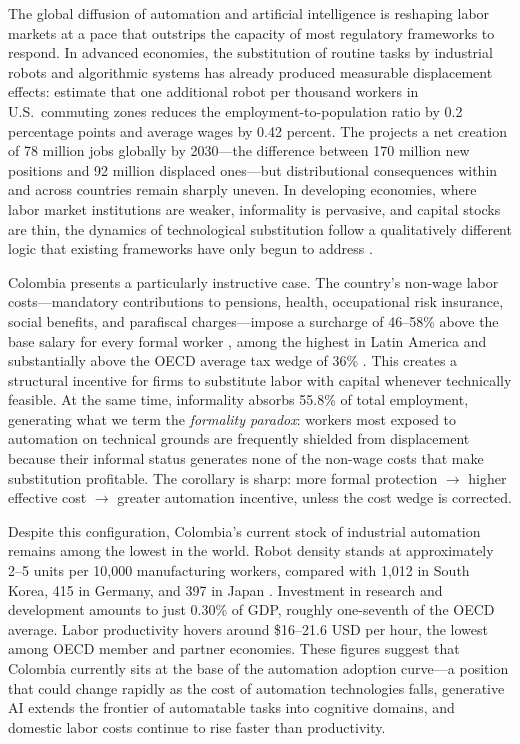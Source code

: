 \documentclass{article}
\begin{document}
The global diffusion of automation and artificial intelligence is reshaping labor markets at a pace that outstrips the capacity of most regulatory frameworks to respond. In advanced economies, the substitution of routine tasks by industrial robots and algorithmic systems has already produced measurable displacement effects: \cite{acemoglu2020robots} estimate that one additional robot per thousand workers in U.S.\ commuting zones reduces the employment-to-population ratio by 0.2 percentage points and average wages by 0.42 percent. The \cite{wef2025} projects a net creation of 78 million jobs globally by 2030---the difference between 170 million new positions and 92 million displaced ones---but distributional consequences within and across countries remain sharply uneven. In developing economies, where labor market institutions are weaker, informality is pervasive, and capital stocks are thin, the dynamics of technological substitution follow a qualitatively different logic that existing frameworks have only begun to address \cite{bid2023, maloney2016}.

Colombia presents a particularly instructive case. The country's non-wage labor costs---mandatory contributions to pensions, health, occupational risk insurance, social benefits, and parafiscal charges---impose a surcharge of 46--58\% above the base salary for every formal worker \cite{anif2018}, among the highest in Latin America and substantially above the OECD average tax wedge of 36\% \cite{oecd2025voces}. This creates a structural incentive for firms to substitute labor with capital whenever technically feasible. At the same time, informality absorbs 55.8\% of total employment, generating what we term the \textit{formality paradox}: workers most exposed to automation on technical grounds are frequently shielded from displacement because their informal status generates none of the non-wage costs that make substitution profitable. The corollary is sharp: more formal protection $\rightarrow$ higher effective cost $\rightarrow$ greater automation incentive, unless the cost wedge is corrected.

Despite this configuration, Colombia's current stock of industrial automation remains among the lowest in the world. Robot density stands at approximately 2--5 units per 10,000 manufacturing workers, compared with 1,012 in South Korea, 415 in Germany, and 397 in Japan \cite{ifr2024}. Investment in research and development amounts to just 0.30\% of GDP, roughly one-seventh of the OECD average. Labor productivity hovers around \$16--21.6 USD per hour, the lowest among OECD member and partner economies. These figures suggest that Colombia currently sits at the base of the automation adoption curve---a position that could change rapidly as the cost of automation technologies falls, generative AI extends the frontier of automatable tasks into cognitive domains, and domestic labor costs continue to rise faster than productivity.
\end{document}
